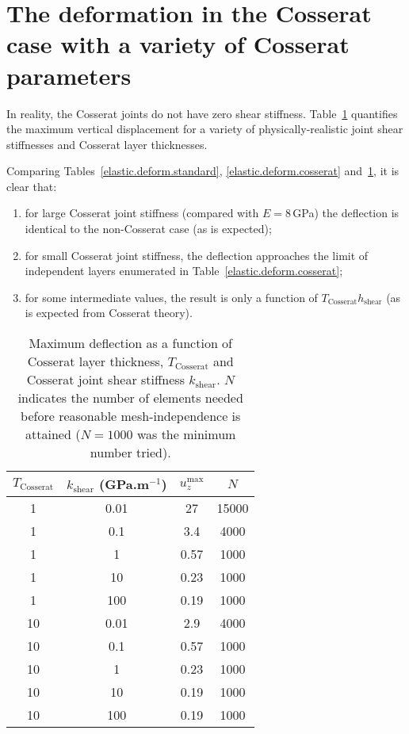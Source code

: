 \documentclass[]{scrreprt}
\begin{document}
\section{The deformation in the Cosserat case with a variety of Cosserat parameters}

In reality, the Cosserat joints do not have zero shear stiffness.
Table~\ref{elastic.deform.cosserat.shear} quantifies the maximum
vertical displacement for a variety of physically-realistic joint
shear stiffnesses and Cosserat layer thicknesses.

Comparing Tables~\ref{elastic.deform.standard},
\ref{elastic.deform.cosserat} and~\ref{elastic.deform.cosserat.shear},
it is clear that:
\begin{enumerate}
\item for large Cosserat joint stiffness (compared with $E=8$\,GPa)
  the deflection is identical to the non-Cosserat case (as is
  expected);
\item for small Cosserat joint stiffness, the deflection approaches
  the limit of independent layers enumerated in
  Table~\ref{elastic.deform.cosserat};
\item for some intermediate values, the result is only a function of
  $T_{\mathrm{Cosserat}}h_{\mathrm{shear}}$ (as is expected from
  Cosserat theory).
\end{enumerate}

\begin{table}[htb]
\begin{center}
\begin{tabular}{cccc}
  $T_{\mathrm{Cosserat}}$  & $k_{\mathrm{shear}}$ (GPa.m$^{-1}$) &
  $u_{z}^{\mathrm{max}}$ & $N$ \\
  \hline
  1 & 0.01 & 27 & 15000 \\
  1 & 0.1 & 3.4 & 4000 \\
  1 & 1 & 0.57 & 1000 \\
  1 & 10 & 0.23 & 1000 \\
  1 & 100 & 0.19 & 1000 \\
  10 & 0.01 & 2.9 & 4000 \\
  10 & 0.1 & 0.57 & 1000 \\
  10 & 1 & 0.23 & 1000 \\
  10 & 10 & 0.19 & 1000 \\
  10 & 100 & 0.19 & 1000 \\
\end{tabular}
\caption{Maximum deflection as a function of Cosserat layer thickness,
  $T_{\mathrm{Cosserat}}$ and Cosserat joint shear stiffness
  $k_{\mathrm{shear}}$.  $N$ indicates the number of elements needed
  before reasonable mesh-independence is attained ($N=1000$ was the
  minimum number tried).}
\label{elastic.deform.cosserat.shear}
\end{center}
\end{table}
\end{document}
